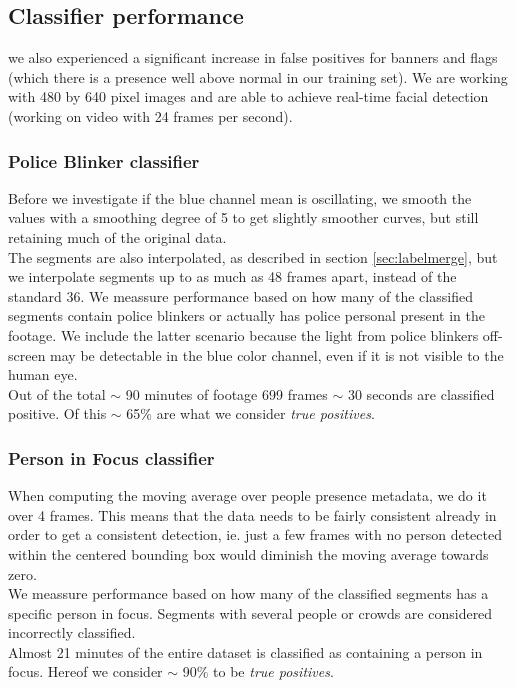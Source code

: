 \subsection{Classifier performance}
%
we also experienced a significant increase in false positives for banners and flags (which there is a presence well above normal in our training set). We are working with 480 by 640 pixel images and are able to achieve real-time facial detection (working on video with 24 frames per second).\\
%
\subsubsection{Police Blinker classifier}
%
Before we investigate if the blue channel mean is oscillating, we smooth the values with a smoothing degree of 5 to get slightly smoother curves, but still retaining much of the original data.\\
The segments are also interpolated, as described in section \ref{sec:labelmerge}, but we interpolate segments up to as much as 48 frames apart, instead of the standard 36.
%
We meassure performance based on how many of the classified segments contain police blinkers or actually has police personal present in the footage. We include the latter scenario because the light from police blinkers off-screen may be detectable in the blue color channel, even if it is not visible to the human eye.\\
Out of the total $\sim$ 90 minutes of footage 699 frames $\sim$ 30 seconds are classified positive. Of this $\sim$ 65\% are what we consider \textit{true positives}.
%
\subsubsection{Person in Focus classifier}
%
When computing the moving average over people presence metadata, we do it over 4 frames. This means that the data needs to be fairly consistent already in order to get a consistent detection, ie. just a few frames with no person detected within the centered bounding box would diminish the moving average towards zero.\\
%
We meassure performance based on how many of the classified segments has a specific person in focus. Segments with several people or crowds are considered incorrectly classified.\\
Almost 21 minutes of the entire dataset is classified as containing a person in focus. Hereof we consider $\sim$ 90\% to be \textit{true positives}.
%
%

